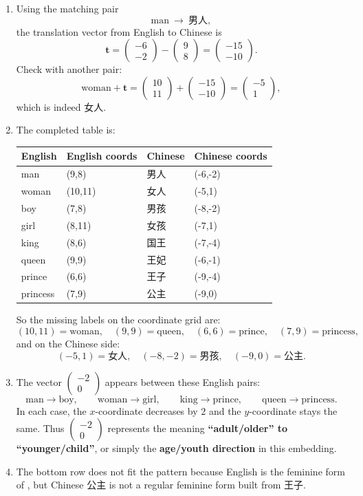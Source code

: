 \documentclass[12pt]{ctexart}
\newcommand{\colvec}[2]{\begin{pmatrix} #1 \\ #2 \end{pmatrix}}
\begin{document}
\begin{enumerate}[label=\textbf{\arabic*.}]
\item Using the matching pair
\[
\text{man}\ \to\ \text{男人},
\]
the translation vector from English to Chinese is
\[
\mathbf{t}
=\colvec{-6}{-2}-\colvec{9}{8}
=\boxed{\colvec{-15}{-10}}.
\]
Check with another pair:
\[
\text{woman}+\mathbf{t}
=\colvec{10}{11}+\colvec{-15}{-10}
=\colvec{-5}{1},
\]
which is indeed 女人.

\item The completed table is:

\begin{center}
\renewcommand{\arraystretch}{1.3}
\begin{tabular}{@{}llll@{}}
\toprule
English & English coords & Chinese & Chinese coords \\
\midrule
man     & (9,8)    & 男人   & (-6,-2) \\
woman   & (10,11)  & 女人   & (-5,1) \\
boy     & (7,8)    & 男孩   & (-8,-2) \\
girl    & (8,11)   & 女孩   & (-7,1) \\
king    & (8,6)    & 国王   & (-7,-4) \\
queen   & (9,9)    & 王妃   & (-6,-1) \\
prince  & (6,6)    & 王子   & (-9,-4) \\
princess& (7,9)    & 公主   & (-9,0) \\
\bottomrule
\end{tabular}
\end{center}

So the missing labels on the coordinate grid are:
\[
(10,11)=\text{woman},\quad
(9,9)=\text{queen},\quad
(6,6)=\text{prince},\quad
(7,9)=\text{princess},
\]
and on the Chinese side:
\[
(-5,1)=\text{女人},\quad
(-8,-2)=\text{男孩},\quad
(-9,0)=\text{公主}.
\]

\item The vector \(\colvec{-2}{0}\) appears between these English pairs:
\[
\text{man}\to\text{boy},\qquad
\text{woman}\to\text{girl},\qquad
\text{king}\to\text{prince},\qquad
\text{queen}\to\text{princess}.
\]
In each case, the \(x\)-coordinate decreases by \(2\) and the \(y\)-coordinate stays the same. Thus \(\colvec{-2}{0}\) represents the meaning \textbf{“adult/older” to “younger/child”}, or simply the \textbf{age/youth direction} in this embedding.

\item The bottom row does not fit the pattern because English  is the feminine form of , but Chinese 公主 is not a regular feminine form built from 王子.


\end{enumerate}
\end{document}
